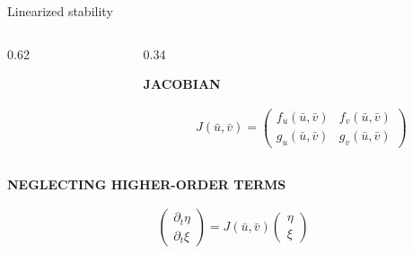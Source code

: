 \begin{frame}{Linearized stability}
\begin{columns}[T,onlytextwidth]
\begin{column}{0.62\textwidth}
    \end{column}

    \begin{column}{0.34\textwidth}
      {\color{HydraGold}\bfseries\fontsize{7.7}{9.2}\selectfont
        \centering JACOBIAN\par}

      \vspace{-0.26cm}

    {\color{HydraWhite}\fontsize{10.2}{13}\selectfont
    \begin{align*}
      \boxed{
        J(\bar u,\bar v)
        =
        \begin{pmatrix}
          f_u(\bar u,\bar v) & f_v(\bar u,\bar v)
          \\
          g_u(\bar u,\bar v) & g_v(\bar u,\bar v)
        \end{pmatrix}
      }
    \end{align*}
    }


    \end{column}

  \end{columns}

  \vspace{-0.12cm}

  {\color{HydraGold}\bfseries\fontsize{7.7}{9.2}\selectfont
    NEGLECTING HIGHER-ORDER TERMS\par}

  \vspace{-0.32cm}

  {\color{HydraWhite}\bfseries\fontsize{12.8}{16}\selectfont
  \begin{align*}
    \boxed{
      \begin{pmatrix}
        \partial_t \eta
        \\
        \partial_t \xi
      \end{pmatrix}
      =
      J(\bar u,\bar v)
      \begin{pmatrix}
        \eta
        \\
        \xi
      \end{pmatrix}
    }
  \end{align*}
  }

  \vspace{-0.30cm}


\end{frame}


